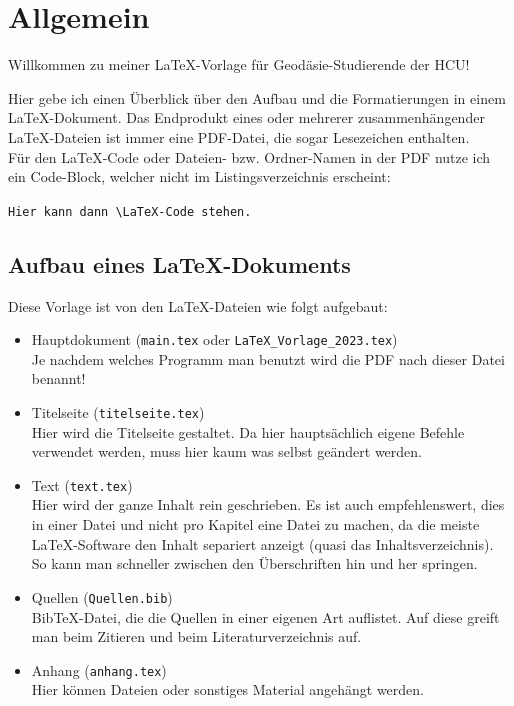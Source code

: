 \section{Allgemein} \label{sec:ersteSec}

Willkommen zu meiner \LaTeX-Vorlage für Geodäsie-Studierende der HCU!

Hier gebe ich einen Überblick über den Aufbau und die Formatierungen in einem \LaTeX-Dokument. Das Endprodukt eines oder mehrerer zusammenhängender \LaTeX-Dateien ist immer eine PDF-Datei, die sogar Lesezeichen enthalten.\\

Für den \LaTeX-Code oder Dateien- bzw. Ordner-Namen in der PDF nutze ich ein Code-Block, welcher nicht im Listingsverzeichnis erscheint:

\verb|Hier kann dann \LaTeX-Code stehen.|


\subsection{Aufbau eines \LaTeX-Dokuments} \label{sec:aufbau}

Diese Vorlage ist von den \LaTeX-Dateien wie folgt aufgebaut:

\begin{itemize}
    \item Hauptdokument (\verb|main.tex| oder \verb|LaTeX_Vorlage_2023.tex|)\\
    Je nachdem welches Programm man benutzt wird die PDF nach dieser Datei benannt!
    \item Titelseite (\verb|titelseite.tex|)\\
    Hier wird die Titelseite gestaltet. Da hier hauptsächlich eigene Befehle verwendet werden, muss hier kaum was selbst geändert werden.
    \item Text (\verb|text.tex|)\\
    Hier wird der ganze Inhalt rein geschrieben. Es ist auch empfehlenswert, dies in einer Datei und nicht pro Kapitel eine Datei zu machen, da die meiste \LaTeX-Software den Inhalt separiert anzeigt (quasi das Inhaltsverzeichnis). So kann man schneller zwischen den Überschriften hin und her springen.
    \item Quellen (\verb|Quellen.bib|)\\
    BibTeX-Datei, die die Quellen in einer eigenen Art auflistet. Auf diese greift man beim Zitieren und beim Literaturverzeichnis auf.
    \item Anhang (\verb|anhang.tex|)\\
    Hier können Dateien oder sonstiges Material angehängt werden.
\end{itemize}

